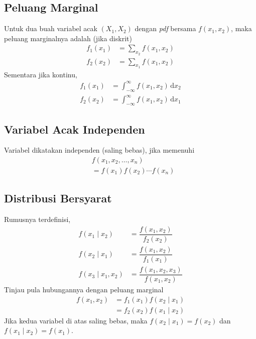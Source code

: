 \documentclass[a4paper,extrafontsizes, 9pt]{memoir}
\begin{document}
\begin{multicols}{3}
			\subsection*{\small Peluang Marginal}
				Untuk dua buah variabel acak $\left(X_{1}, X_{2}\right)$ dengan \textsl{pdf} bersama $f\left(x_{1}, x_{2}\right)$, maka peluang marginalnya adalah (jika diskrit)
					\begin{align*}
						f_{1}\left(x_{1}\right) & = \sum_{x_{2}}f\left(x_{1}, x_{2}\right)\\
						f_{2}\left(x_{2}\right) & = \sum_{x_{1}}f\left(x_{1}, x_{2}\right)
					\end{align*}
				Sementara jika kontinu,
					\begin{align*}
						f_{1}\left(x_{1}\right) & = \int_{-\infty}^{\infty}f\left(x_{1}, x_{2}\right)\, \mathrm{d}x_{2}\\
						f_{2}\left(x_{2}\right) & = \int_{-\infty}^{\infty}f\left(x_{1}, x_{2}\right)\, \mathrm{d}x_{1}
					\end{align*}
					
			\subsection*{\small Variabel Acak Independen}
				Variabel dikatakan independen (saling bebas), jika memenuhi
					\begin{align*}
						& f\left(x_{1}, x_{2}, \ldots, x_{n}\right)\\
						& = f\left(x_{1}\right)f\left(x_{2}\right)\cdots f\left(x_{n}\right)
					\end{align*}
			
			\subsection*{\small Distribusi Bersyarat}
				Rumusnya terdefinisi,
					\begin{align*}
						f\left(x_{1} \mid x_{2}\right) & = \dfrac{f\left(x_{1}, x_{2}\right)}{f_{2}\left(x_{2}\right)}\\
						f\left(x_{2} \mid x_{1}\right) & = \dfrac{f\left(x_{1}, x_{2}\right)}{f_{1}\left(x_{1}\right)}\\
						f\left(x_{3} \mid x_{1}, x_{2}\right) & = \dfrac{f\left(x_{1}, x_{2}, x_{3}\right)}{f\left(x_{1}, x_{2}\right)}
					\end{align*}
				Tinjau pula hubungannya dengan peluang marginal
					\begin{align*}
						f\left(x_{1}, x_{2}\right) & = f_{1}\left(x_{1}\right)f\left(x_{2} \mid x_{1}\right)\\
						& = f_{2}\left(x_{2}\right)f\left(x_{1} \mid x_{2}\right)
					\end{align*}
				Jika kedua variabel di atas saling bebas, maka $f(x_{2} \mid x_{1}) = f(x_{2})$ dan $f(x_{1} \mid x_{2}) = f(x_{1})$.
		

\end{multicols}
\end{document}
